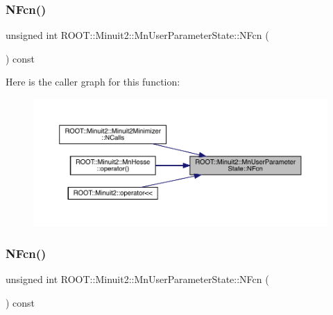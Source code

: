 \subsubsection{\texorpdfstring{NFcn()}{NFcn()}\hspace{0.1cm}{\footnotesize\ttfamily [1/2]}}
{\footnotesize\ttfamily unsigned int R\+O\+O\+T\+::\+Minuit2\+::\+Mn\+User\+Parameter\+State\+::\+N\+Fcn (\begin{DoxyParamCaption}{ }\end{DoxyParamCaption}) const\hspace{0.3cm}{\ttfamily [inline]}}

Here is the caller graph for this function\+:\nopagebreak
\begin{figure}[H]
\begin{center}
\leavevmode
\includegraphics[width=350pt]{d3/de0/classROOT_1_1Minuit2_1_1MnUserParameterState_a21fb0f06261f9bed8359263a99f7d5ca_icgraph}
\end{center}
\end{figure}
\mbox{\label{classROOT_1_1Minuit2_1_1MnUserParameterState_a21fb0f06261f9bed8359263a99f7d5ca}} 
\subsubsection{\texorpdfstring{NFcn()}{NFcn()}\hspace{0.1cm}{\footnotesize\ttfamily [2/2]}}
{\footnotesize\ttfamily unsigned int R\+O\+O\+T\+::\+Minuit2\+::\+Mn\+User\+Parameter\+State\+::\+N\+Fcn (\begin{DoxyParamCaption}{ }\end{DoxyParamCaption}) const\hspace{0.3cm}{\ttfamily [inline]}}

